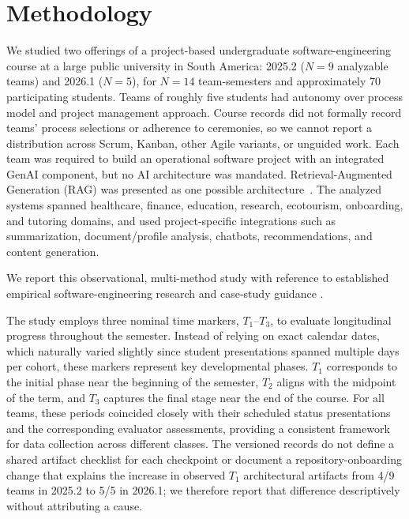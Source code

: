 \section{Methodology}
\label{sec:method}

We studied two offerings of a project-based undergraduate software-engineering
course at a large public university in South America: 2025.2 ($N=9$
analyzable teams) and 2026.1 ($N=5$), for $N=14$ team-semesters and
approximately 70 participating students. Teams of roughly five students had
autonomy over process model and project management approach. Course records
did not formally record teams' process selections or adherence to ceremonies,
so we cannot report a distribution across Scrum, Kanban, other Agile variants,
or unguided work. Each team was required to build an operational software
project with an integrated GenAI component, but no AI architecture was
mandated. Retrieval-Augmented Generation (RAG) was presented as one possible
architecture~\cite{lewis2020retrieval}. The analyzed systems spanned
healthcare, finance, education, research, ecotourism, onboarding, and tutoring
domains, and used project-specific integrations such as summarization,
document/profile analysis, chatbots, recommendations, and content generation.

We report this observational, multi-method study with reference to established
empirical software-engineering research and case-study guidance
\cite{stol2018abc,runeson2009case}.

\label{sec:data-sources}
The study employs three nominal time markers, $T_1$--$T_3$, to evaluate 
longitudinal progress throughout the semester. Instead of relying on exact 
calendar dates, which naturally varied slightly since student presentations 
spanned multiple days per cohort, these markers represent key developmental 
phases. $T_1$ corresponds to the initial phase near the beginning of the 
semester, $T_2$ aligns with the midpoint of the term, and $T_3$ captures 
the final stage near the end of the course. For all teams, these periods 
coincided closely with their scheduled status presentations and the 
corresponding evaluator assessments, providing a consistent framework for 
data collection across different classes. The versioned records do not 
define a shared artifact checklist for each checkpoint or document a 
repository-onboarding change that explains the increase in observed $T_1$ 
architectural artifacts from 4/9 teams in 2025.2 to 5/5 in 2026.1; we 
therefore report that difference descriptively without attributing a cause.

